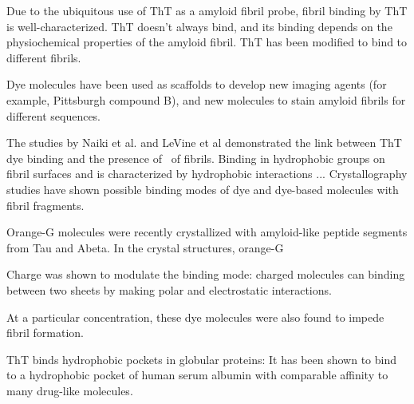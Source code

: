 Due to the ubiquitous use of ThT as a amyloid fibril probe, fibril binding by ThT is well-characterized.  ThT doesn't always bind, and its binding depends on the physiochemical properties of the amyloid fibril.  ThT has been modified to bind to different fibrils.\cite{XXX}

Dye molecules have been used as scaffolds to develop new imaging agents (for example, Pittsburgh compound B), and new molecules to stain amyloid fibrils for different sequences. 


The studies by Naiki et al. and LeVine et al demonstrated the link between ThT dye binding and the presence of \crossbs\ of fibrils. Binding in hydrophobic groups on fibril surfaces and is characterized by hydrophobic interactions ...
Crystallography studies have shown possible binding modes of dye and dye-based molecules with fibril fragments.\cite{XXX}

Orange-G molecules were recently crystallized with amyloid-like peptide segments from Tau and Abeta.  In the crystal structures, orange-G 

Charge was shown to modulate the binding mode: charged molecules can binding between two sheets by making polar and electrostatic interactions.

At a particular concentration, these dye molecules were also found to impede fibril formation.\cite{XXX}

ThT binds hydrophobic pockets in globular proteins: It has been shown to bind to a hydrophobic pocket of human serum albumin with comparable affinity to many drug-like molecules.\cite{Groenning:2007p3436,Groenning:2007eo}



